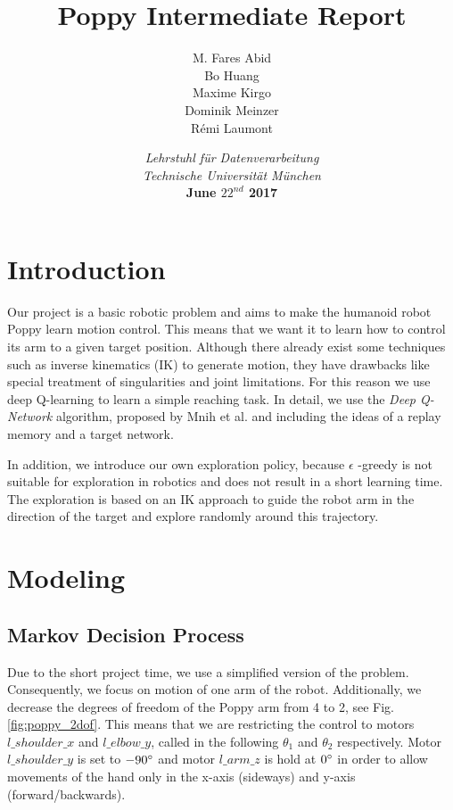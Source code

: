 \documentclass{article}
\title{\Huge{Poppy Intermediate Report}}
\author{M. Fares Abid \\ Bo Huang \\ Maxime Kirgo \\ Dominik Meinzer \\ Rémi Laumont }
\date{\textit{Lehrstuhl für Datenverarbeitung} \\ \textit{Technische Universität München} \\ \textbf{June $22^{nd}$ 2017}}
\begin{document}
\maketitle



\section{Introduction}

Our project is a basic robotic problem and aims to make the humanoid robot Poppy learn motion control. This means that we want it to learn how to control its arm to a given target position. Although there already exist some techniques such as inverse kinematics (IK) to generate motion, they have drawbacks like special treatment of singularities and joint limitations. For this reason we use deep Q-learning to learn a simple reaching task. In detail, we use the \textit{Deep Q-Network} algorithm, proposed by Mnih et al. \cite{mnih_human, mnih_play} and including the ideas of a replay memory and a target network.

\vspace{\baselineskip}

In addition, we introduce our own exploration policy, because $\epsilon$ -greedy is not suitable for exploration in robotics and does not result in a short learning time. The exploration is based on an IK approach to guide the robot arm in the direction of the target and explore randomly around this trajectory. 

\section{Modeling}

\subsection{Markov Decision Process}
Due to the short project time, we use a simplified version of the problem. Consequently, we focus on motion of one arm of the robot. Additionally, we decrease the degrees of freedom of the Poppy arm from 4 to 2, see Fig. \ref{fig:poppy_2dof}. This means that we are restricting the control to motors \textit{$l\_shoulder\_x$} and \textit{$l\_elbow\_y$}, called in the following $\theta_1$ and $\theta_2$ respectively. Motor $l\_shoulder\_y$ is set to $-90\degree$ and motor $l\_arm\_z$ is hold at $0\degree$ in order to allow movements of the hand only in the x-axis (sideways) and y-axis (forward/backwards).
\end{document}

